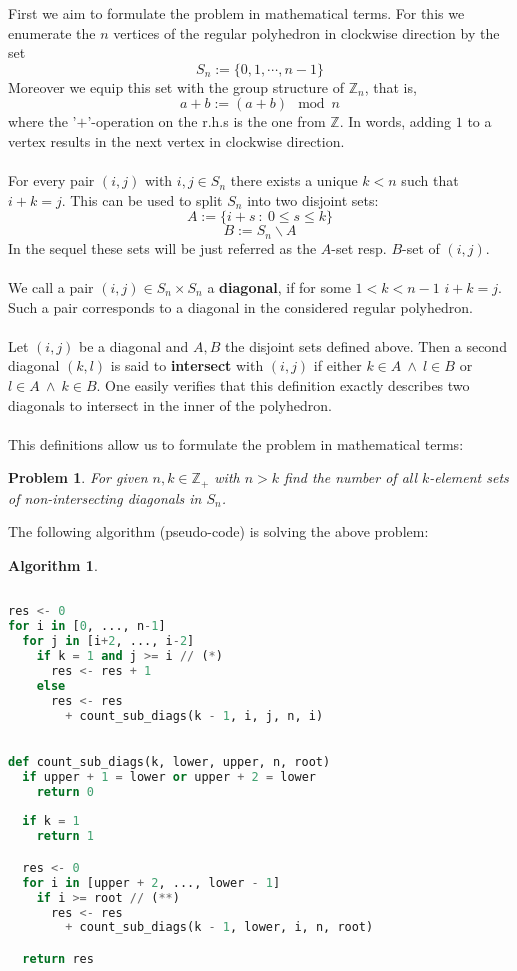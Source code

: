 \documentclass[17pt]{extarticle}
\newtheorem*{problem*}{Problem}
\newtheorem*{algorithm*}{Algorithm}
\begin{document}
First we aim to formulate the problem in mathematical terms.
For this we enumerate the $n$ vertices of the regular polyhedron in clockwise direction by the set
$$
S_n:= \{0, 1, \cdots, n-1\}
$$
Moreover we equip this set with the group structure of $\mathbb{Z}_n$, that is, 
$$a+b:=(a+b) \mod n$$
where the '$+$'-operation on the r.h.s is the one from $\mathbb{Z}$.
In words, adding $1$ to a vertex results in the next vertex in clockwise direction.\\ \\
For every pair $(i,j)$ with $i,j\in S_n$ there exists a unique $k<n$ such that $i+k=j$.
This can be used to split $S_n$ into two disjoint sets:
$$
A:=\{i+s \ : \ 0\leq s \leq k\}
$$
$$
B:=S_n \backslash A
$$
In the sequel these sets will be just referred as the $A$-set resp. $B$-set of $(i,j)$.
\\ \\
We call a pair $(i,j)\in S_n\times S_n$ a \textbf{diagonal}, if for some $1<k<n-1$ 
$i+k=j$. Such a pair corresponds to a diagonal in the considered regular polyhedron.
\\ \\
Let $(i,j)$ be a diagonal and $A, B$ the disjoint sets defined above.
Then a second diagonal $(k,l)$ is said to \textbf{intersect} with $(i,j)$ if either $k\in A \ \wedge \ l\in B$
or $l\in A \ \wedge \ k\in B$. One easily verifies that this definition exactly describes two diagonals
to intersect in the inner of the polyhedron.\\ \\
This definitions allow us to formulate the problem in mathematical terms:
\begin{problem*}
	For given $n,k\in\mathbb{Z}_+$ with $n>k$ find the number of all $k$-element sets of non-intersecting diagonals
	in $S_n$.
\end{problem*}
The following algorithm (pseudo-code) is solving the above problem:
\begin{algorithm*}
\begin{lstlisting}[language=Python]
	
res <- 0
for i in [0, ..., n-1] 
  for j in [i+2, ..., i-2]
    if k = 1 and j >= i // (*)
      res <- res + 1
    else
      res <- res 
        + count_sub_diags(k - 1, i, j, n, i)

      
def count_sub_diags(k, lower, upper, n, root)
  if upper + 1 = lower or upper + 2 = lower
    return 0
  
  if k = 1
    return 1

  res <- 0
  for i in [upper + 2, ..., lower - 1]
    if i >= root // (**)	
      res <- res 
        + count_sub_diags(k - 1, lower, i, n, root)

  return res
    
 \end{lstlisting}
\end{algorithm*}
\end{document}
